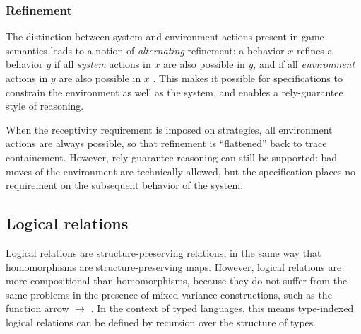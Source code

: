 \documentclass[acmsmall,timestamp,review,anonymous]{acmart}
\begin{document}

\subsubsection{Refinement} \label{sec:mainideas:gs:ref} %

The distinction between system and environment actions
present in game semantics
leads to a notion of \emph{alternating} refinement:
a behavior $x$ refines a behavior $y$ if
all \emph{system} actions in $x$ are also possible in $y$, and if
all \emph{environment} actions in $y$ are also possible in $x$
\cite{altref,gmos}.
This makes it possible for specifications to
constrain the environment as well as the system,
and enables a rely-guarantee style of reasoning.

When the receptivity requirement is imposed on strategies,
all environment actions are always possible,
so that refinement is ``flattened'' back to trace containement.
However,
rely-guarantee reasoning can still be supported:
bad moves of the environment are technically allowed,
but the specification places no requirement on
the subsequent behavior of the system.



\subsection{Logical relations} %

Logical relations are structure-preserving relations,
in the same way that homomorphisms are structure-preserving maps.
However,
logical relations are more compositional than homomorphisms,
because they do not suffer from the same problems
in the presence of mixed-variance constructions,
such as the function arrow $\rightarrow$ \cite{lrp}.
In the context of typed languages,
this means type-indexed logical relations
can be defined by recursion over the structure of types.

\end{document}
